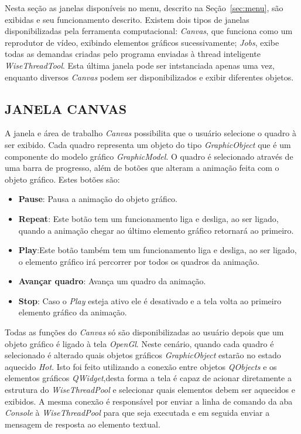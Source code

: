 Nesta seção as janelas disponíveis no menu, descrito na Seção~\ref{sec:menu}, são exibidas e seu funcionamento descrito. Existem dois tipos de janelas disponibilizadas pela ferramenta computacional: \textit{Canvas}, que funciona como um reprodutor de vídeo, exibindo elementos gráficos sucessivamente; \textit{Jobs}, exibe todas as demandas criadas pelo programa enviadas à thread inteligente \textit{WiseThreadTool}. Esta última janela pode ser intstanciada apenas uma vez, enquanto diversos \textit{Canvas} podem ser disponibilizados e exibir diferentes objetos.

\subsection{JANELA CANVAS}\label{sec:janela_canvas}

A janela e área de trabalho \textit{Canvas} possibilita que o usuário selecione o quadro à ser exibido. Cada quadro representa um objeto do tipo \textit{GraphicObject} que é um componente do modelo gráfico \textit{GraphicModel}. O quadro é selecionado através de uma barra de progresso, além de botões que alteram a animação feita com o objeto gráfico. Estes botões são:

\begin{itemize}
	\item \textbf{Pause}: Pausa a animação do objeto gráfico.
	\item \textbf{Repeat}: Este botão tem um funcionamento liga e desliga, ao ser ligado, quando a animação chegar ao último elemento gráfico retornará ao primeiro.
	\item \textbf{Play}:Este botão também tem um funcionamento liga e desliga, ao ser ligado, o elemento gráfico irá percorrer por todos os quadros da animação.
	\item \textbf{Avançar quadro}: Avança um quadro da animação.
	\item \textbf{Stop}: Caso o \textit{Play} esteja ativo ele é desativado e a tela volta ao primeiro elemento gráfico da animação.
\end{itemize}

Todas as funções do \textit{Canvas} só são disponibilizadas ao usuário depois que um objeto gráfico é ligado à tela \textit{OpenGl}. Neste cenário, quando cada quadro é selecionado é alterado quais objetos gráficos \textit{GraphicObject} estarão no estado aquecido \textit{Hot}. Isto foi feito utilizando a conexão entre objetos \textit{QObjects} e os elementos gráficos \textit{QWidget},desta forma a tela é capaz de acionar diretamente a estrutura do \textit{WiseThreadPool} e selecionar quais elementos debem ser aquecidos e exibidos. A mesma conexão é responsável por enviar a linha de comando da aba \textit{Console} à \textit{WiseThreadPool} para que seja executada e em seguida enviar a mensagem de resposta ao elemento textual.

